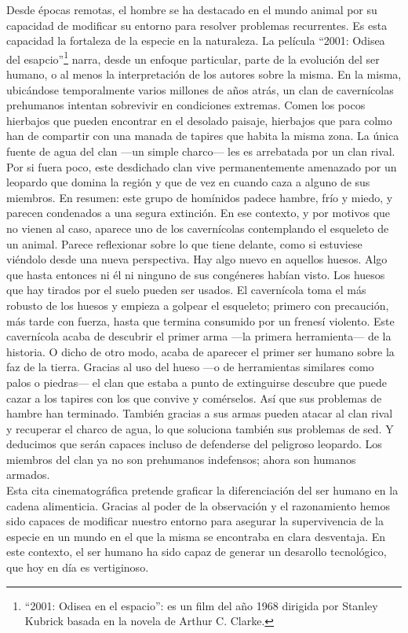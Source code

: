Desde épocas remotas, el hombre se ha destacado en el mundo animal por su capacidad de modificar su entorno para resolver problemas recurrentes. Es esta capacidad la fortaleza de la especie en la naturaleza. La película ``2001: Odisea del esapcio''\footnote{``2001: Odisea en el espacio'': es un film del año 1968 dirigida por Stanley Kubrick basada en la novela de Arthur C. Clarke.} narra, desde un enfoque particular, parte de la evolución del ser humano, o al menos la interpretación de los autores sobre la misma. En la misma, ubicándose temporalmente varios millones de años atrás, un clan de cavernícolas prehumanos intentan sobrevivir en condiciones extremas. Comen los pocos hierbajos que pueden encontrar en el desolado paisaje, hierbajos que para colmo han de compartir con una manada de tapires que habita la misma zona. La única fuente de agua del clan —un simple charco— les es arrebatada por un clan rival. Por si fuera poco, este desdichado clan vive permanentemente amenazado por un leopardo que domina la región y que de vez en cuando caza a alguno de sus miembros. En resumen: este grupo de homínidos padece hambre, frío y miedo, y parecen condenados a una segura extinción. En ese contexto, y por motivos que no vienen al caso, aparece uno de los cavernícolas contemplando el esqueleto de un animal. Parece reflexionar sobre lo que tiene delante, como si estuviese viéndolo desde una nueva perspectiva. Hay algo nuevo en aquellos huesos. Algo que hasta entonces ni él ni ninguno de sus congéneres habían visto. Los huesos que hay tirados por el suelo pueden ser usados. El cavernícola toma el más robusto de los huesos y empieza a golpear el esqueleto; primero con precaución, más tarde con fuerza, hasta que termina consumido por un frenesí violento. Este cavernícola acaba de descubrir el primer arma —la primera herramienta— de la historia. O dicho de otro modo, acaba de aparecer el primer ser humano sobre la faz de la tierra. Gracias al uso del hueso —o de herramientas similares como palos o piedras— el clan que estaba a punto de extinguirse descubre que puede cazar a los tapires con los que convive y comérselos. Así que sus problemas de hambre han terminado. También gracias a sus armas pueden atacar al clan rival y recuperar el charco de agua, lo que soluciona también sus problemas de sed. Y deducimos que serán capaces incluso de defenderse del peligroso leopardo. Los miembros del clan ya no son prehumanos indefensos; ahora son humanos armados.\\
Esta cita cinematográfica pretende graficar la diferenciación del ser humano en la cadena alimenticia. Gracias al poder de la observación y el razonamiento hemos sido capaces de modificar nuestro entorno para asegurar la supervivencia de la especie en un mundo en el que la misma se encontraba en clara desventaja. En este contexto, el ser humano ha sido capaz de generar un desarollo tecnológico, que hoy en día es vertiginoso.\\


